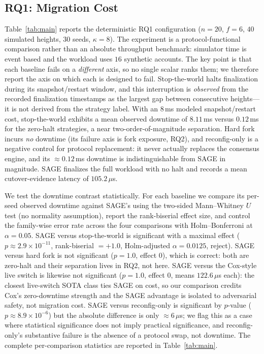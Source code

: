 \documentclass[journal]{IEEEtran}
\theoremstyle{remark}
\begin{document}
\subsection{RQ1: Migration Cost}
Table~\ref{tab:main} reports the deterministic RQ1
configuration ($n=20$, $f=6$, $40$ simulated heights, $30$ seeds, $\kappa=8$). The experiment is
a protocol-functional comparison rather than an absolute throughput benchmark: simulator time is
event based and the workload uses $16$ synthetic accounts. The key point is that each baseline
fails on a \emph{different} axis, so no single scalar ranks them; we therefore report the axis on
which each is designed to fail. Stop-the-world halts finalization during its snapshot/restart
window, and this interruption is \emph{observed} from the recorded finalization timestamps as the
largest gap between consecutive heights---it is not derived from the strategy label. With an
$8\,$ms modeled snapshot/restart cost, stop-the-world exhibits a mean observed downtime of
$8.11\,$ms versus $0.12\,$ms for the zero-halt strategies, a near two-order-of-magnitude
separation. Hard fork incurs \emph{no} downtime (its failure axis is fork exposure, RQ2), and
reconfig-only is a negative control for protocol replacement: it never actually replaces the
consensus engine, and its $\approx 0.12\,$ms downtime is indistinguishable from SAGE in
magnitude. SAGE
finalizes the full workload with no halt and records a mean cutover-evidence latency of
$105.2\,\mu$s.

We test the downtime contrast statistically. For each baseline we compare its per-seed observed
downtime against SAGE's using the two-sided Mann--Whitney $U$ test (no normality assumption),
report the rank-biserial effect size, and control the family-wise error rate across the four
comparisons with Holm--Bonferroni at $\alpha=0.05$. SAGE versus stop-the-world is significant
with a maximal effect ($p\approx 2.9\times10^{-11}$, rank-biserial $=+1.0$, Holm-adjusted
$\alpha=0.0125$, reject). SAGE versus hard fork is not significant ($p=1.0$, effect $0$), which
is correct: both are zero-halt and their separation lives in RQ2, not here. SAGE versus the
Cox-style live switch is likewise not significant ($p=1.0$, effect $0$, means $122.6\,\mu$s
each): the closest live-switch SOTA class ties SAGE on cost, so our comparison credits Cox's
zero-downtime strength and the SAGE advantage is isolated to adversarial safety, not migration
cost. SAGE versus
reconfig-only is significant by $p$-value ($p\approx 8.9\times10^{-6}$) but the absolute
difference is only $\approx 6\,\mu$s; we flag this as a case where statistical significance does
not imply practical significance, and reconfig-only's substantive failure is the absence of a
protocol swap, not downtime. The complete per-comparison statistics are reported in
Table~\ref{tab:main}.
\end{document}
